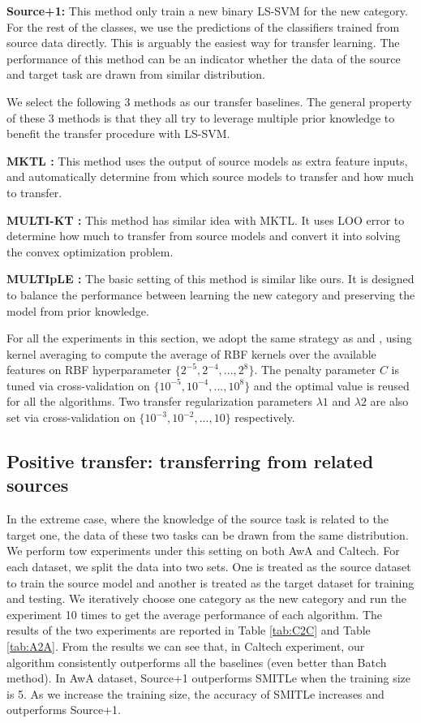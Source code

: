 \textbf{Source+1:} This method only train a new binary LS-SVM for the new category. For the rest of the classes, we use the predictions of the classifiers trained from source data directly. This is arguably the easiest way for transfer learning. The performance of this method can be an indicator whether the data of the source and target task are drawn from similar distribution.

We select the following 3 methods as our transfer baselines. The general property of these 3 methods is that they all try to leverage multiple prior knowledge to benefit the transfer procedure with LS-SVM.

\textbf{MKTL \cite{jie2011multiclass}:} This method uses the output of source models as extra feature inputs, and automatically determine from which source models to transfer and how much to transfer.


\textbf{MULTI-KT \cite{tommasi2014learning}:} This method has similar idea with MKTL. It uses LOO error to determine how much to transfer from source models and convert it into solving the convex optimization problem.

\textbf{MULTIpLE \cite{kuzborskij2013n}:} The basic setting of this method is similar like ours. It is designed to balance the performance between learning the new category and preserving the model from prior knowledge.

For all the experiments in this section, we adopt the same strategy as \cite{kuzborskij2013n} and \cite{tommasi2014learning}, using kernel averaging \cite{gehler2009feature} to compute the average of RBF kernels over the available features on RBF hyperparameter $\{2^{-5},2^{-4},...,2^8\}$. The penalty parameter $C$ is tuned via cross-validation on $\{10^{-5},10^{-4},...,10^8\}$ and the optimal value is reused for all the algorithms.
Two transfer regularization parameters $\lambda1$ and $\lambda2$ are also set via cross-validation on $\{10^{-3},10^{-2},...,10\}$ respectively.

\subsection{Positive transfer: transferring from related sources}
In the extreme case, where the knowledge of the source task is related to the target one, the data of these two tasks can be drawn from the same distribution. 
We perform tow experiments under this setting on both AwA and Caltech. For each dataset, we split the data into two sets. One is treated as the source dataset to train the source model and another is treated as the target dataset for training and testing. We iteratively choose one category as the new category and run the experiment 10 times to get the average performance of each algorithm. The results of the two experiments are reported in Table \ref{tab:C2C} and Table \ref{tab:A2A}. From the results we can see that, in Caltech experiment, our algorithm consistently outperforms all the baselines (even better than Batch method). In AwA dataset, Source+1 outperforms SMITLe when the training size is 5. As we increase the training size, the accuracy of SMITLe increases and outperforms Source+1.

